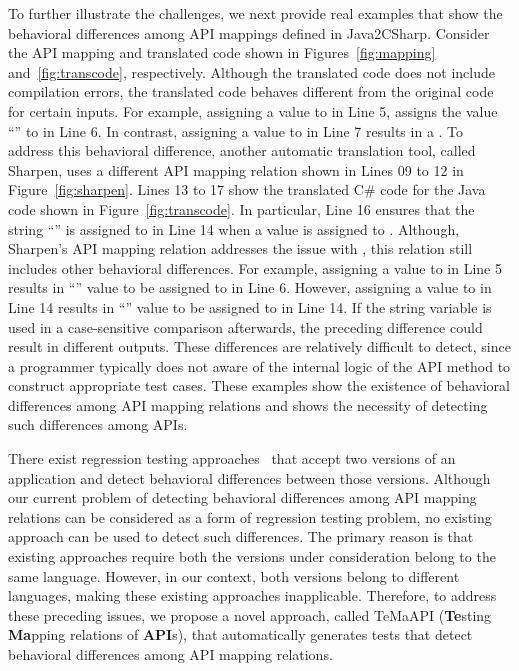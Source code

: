 To further illustrate the challenges, we next provide real examples that show the behavioral differences among API mappings defined in Java2CSharp. Consider the API mapping and translated code shown in Figures~\ref{fig:mapping} and~\ref{fig:transcode}, respectively. Although the translated code does not include compilation errors, the translated code behaves different from the original code for certain inputs. For example, assigning a  value to  in Line 5, assigns the value ``'' to   in Line 6. In contrast, assigning a  value to  in Line 7 results in a . To address this behavioral difference, another automatic translation tool, called Sharpen, uses a different API mapping relation shown in Lines 09 to 12 in Figure~\ref{fig:sharpen}. Lines 13 to 17 show the translated C\# code for the Java code shown in Figure~\ref{fig:transcode}. In particular, Line 16 ensures that the string ``'' is assigned to  in Line 14 when a  value is assigned to . Although, Sharpen's API mapping relation addresses the issue with , this relation still includes other behavioral differences. For example, assigning a  value to  in Line 5 results in ``'' value to be assigned to  in Line 6. However, assigning a  value to  in Line 14 results in ``'' value to be assigned to  in Line 14. If the string variable  is used in a case-sensitive comparison afterwards, the preceding difference could result in different outputs. These differences are relatively difficult to detect, since a programmer typically does not aware of the internal logic of the API method to construct appropriate test cases. These examples show the existence of behavioral differences among API mapping relations and shows the necessity of detecting such differences among APIs.

There exist regression testing approaches~\cite{taneja08diffgen, robert07difference} that accept two versions of an application and detect behavioral differences between those versions. Although our current problem of detecting behavioral differences among API mapping relations can be considered as a form of regression testing problem, no existing approach can be used to detect such differences. The primary reason is that existing approaches require both the versions under consideration belong to the same language. However, in our context, both versions belong to different languages, making these existing approaches inapplicable. Therefore, to address these preceding issues, we propose a novel approach, called TeMaAPI (\textbf{Te}sting \textbf{Ma}pping relations of \textbf{API}s), that automatically generates tests that detect behavioral differences among API mapping relations.


